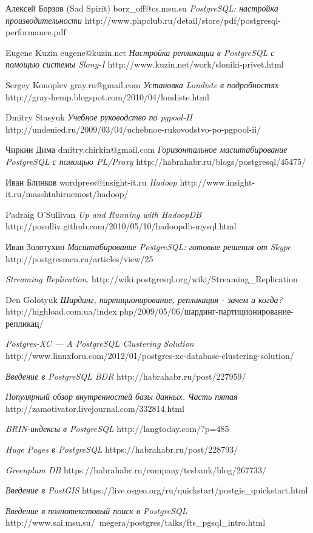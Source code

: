 \renewcommand\bibname{Литература}

\begin{thebibliography}{9}

  Алексей Борзов (Sad Spirit) borz\_off@cs.msu.su
  \emph{PostgreSQL: настройка производительности}
  http://www.phpclub.ru/detail/store/pdf/postgresql-performance.pdf

  Eugene Kuzin eugene@kuzin.net
  \emph{Настройка репликации в PostgreSQL с помощью системы Slony-I}
  http://www.kuzin.net/work/sloniki-privet.html

  Sergey Konoplev gray.ru@gmail.com
  \emph{Установка Londiste в подробностях}
  http://gray-hemp.blogspot.com/2010/04/londiste.html

  Dmitry Stasyuk
  \emph{Учебное руководство по pgpool-II}
  http://undenied.ru/2009/03/04/uchebnoe-rukovodstvo-po-pgpool-ii/

  Чиркин Дима dmitry.chirkin@gmail.com
  \emph{Горизонтальное масштабирование PostgreSQL с помощью PL/Proxy}
  http://habrahabr.ru/blogs/postgresql/45475/

  Иван Блинков wordpress@insight-it.ru
  \emph{Hadoop}
  http://www.insight-it.ru/masshtabiruemost/hadoop/

  Padraig O'Sullivan
  \emph{Up and Running with HadoopDB}
  http://posulliv.github.com/2010/05/10/hadoopdb-mysql.html

  Иван Золотухин
  \emph{Масштабирование PostgreSQL: готовые решения от Skype}
  http://postgresmen.ru/articles/view/25

  \emph{Streaming Replication}.
  http://wiki.postgresql.org/wiki/Streaming\_Replication

  Den Golotyuk
  \emph{Шардинг, партиционирование, репликация - зачем и когда?}
  http://highload.com.ua/index.php/2009/05/06/шардинг-партиционирование-репликац/

  \emph{Postgres-XC — A PostgreSQL Clustering Solution}
  http://www.linuxforu.com/2012/01/postgres-xc-database-clustering-solution/

  \emph{Введение в PostgreSQL BDR}
  http://habrahabr.ru/post/227959/

  \emph{Популярный обзор внутренностей базы данных. Часть пятая}
  http://zamotivator.livejournal.com/332814.html

  \emph{BRIN-индексы в PostgreSQL}
  http://langtoday.com/?p=485

  \emph{Huge Pages в PostgreSQL}
  https://habrahabr.ru/post/228793/

  \emph{Greenplum DB}
  https://habrahabr.ru/company/tcsbank/blog/267733/

  \emph{Введение в PostGIS}
  https://live.osgeo.org/ru/quickstart/postgis\_quickstart.html

  \emph{Введение в полнотекстовый поиск в PostgreSQL}	
  http://www.sai.msu.su/~megera/postgres/talks/fts\_pgsql\_intro.html


\end{thebibliography}